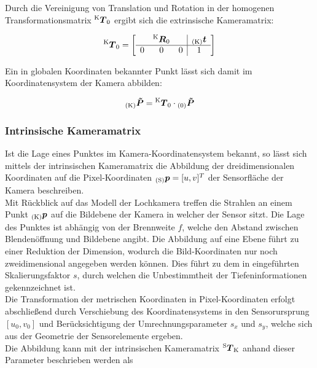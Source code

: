 Durch die Vereinigung von Translation und Rotation in der homogenen Transformationsmatrix $\tmat{K}{0}$ ergibt sich die extrinsische Kameramatrix:

\begin{equation}
\tmat{K}{0} = 
\mat{ccc|c}{
  & \rmat{K}{0} &   & \ve{K}{t} \\
\hline
0 &      0      & 0 & 1 \\
}
\end{equation}


Ein in globalen Koordinaten bekannter Punkt lässt sich damit im Koordinatensystem der Kamera abbilden:

\begin{equation}
\ve{K}{\tilde{P}} = \tmat{K}{0} \cdot \ve{0}{\tilde{P}}
\end{equation}


\subsubsection{Intrinsische Kameramatrix}
Ist die Lage eines Punktes im Kamera-Koordinatensystem bekannt, so lässt sich mittels der intrinsischen Kameramatrix die Abbildung der dreidimensionalen Koordinaten auf die Pixel-Koordinaten $\ve{S}{p} = [u,v]^T$ der Sensorfläche der Kamera beschreiben.\\
Mit Rückblick auf das Modell der Lochkamera treffen die Strahlen an einem Punkt $\ve{K}{{p}}$ auf die Bildebene der Kamera in welcher der Sensor sitzt. Die Lage des Punktes ist abhängig von der Brennweite $f$, welche den Abstand zwischen Blendenöffnung und Bildebene angibt. Die Abbildung auf eine Ebene führt zu einer Reduktion der Dimension, wodurch die Bild-Koordinaten nur noch zweidimensional angegeben werden können. Dies führt zu dem in  eingeführten Skalierungsfaktor $s$, durch welchen die Unbestimmtheit der Tiefeninformationen gekennzeichnet ist.\\

Die Transformation der metrischen Koordinaten in Pixel-Koordinaten erfolgt abschließend durch Verschiebung des Koordinatensystems in den Sensorursprung $[u_0,v_0]$ und Berücksichtigung der Umrechnungsparameter $s_x$ und $s_y$, welche sich aus der Geometrie der Sensorelemente ergeben.\\
Die Abbildung kann mit der intrinsischen Kameramatrix $\tmat{S}{K}$ anhand dieser Parameter beschrieben werden als

